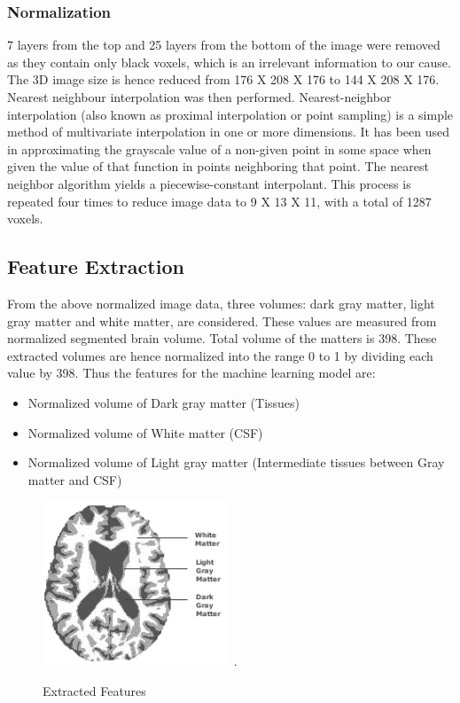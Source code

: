 \documentclass[journal,twoside]{IEEEtran}
\begin{document}
\subsubsection{Normalization}
7 layers from the top and 25 layers from the bottom of the image were removed as they contain only black voxels, which is an irrelevant information to our cause. The 3D image size is hence reduced from 176 X 208 X 176 to 144 X 208 X 176.
Nearest neighbour interpolation was then performed. Nearest-neighbor interpolation (also known as proximal interpolation or point sampling) is a simple method of multivariate interpolation in one or more dimensions. It has been used in approximating the grayscale value of a non-given point in some space when given the value of that function in points neighboring that point. The nearest neighbor algorithm yields a piecewise-constant interpolant. This process is repeated four times to reduce image data to 9 X 13 X 11, with a total of 1287 voxels.
\subsection{Feature Extraction}
From the above normalized image data, three volumes: dark gray matter, light gray matter and white matter, are considered. These values are measured from normalized segmented brain volume. Total volume of the matters is 398. These extracted volumes are hence normalized into the range 0 to 1 by dividing each value by 398. Thus the features for the machine learning model are:
\begin{itemize}
	\item Normalized volume of Dark gray matter (Tissues)
	\item Normalized volume of White matter (CSF)
	\item Normalized volume of Light gray matter (Intermediate tissues between Gray matter and CSF)
\end{itemize}
\begin{figure}[h]
\centering
\includegraphics[width=2.2in]{Features.png}
\DeclareGraphicsExtensions.
\caption{Extracted Features}
\end{figure}
\end{document}
